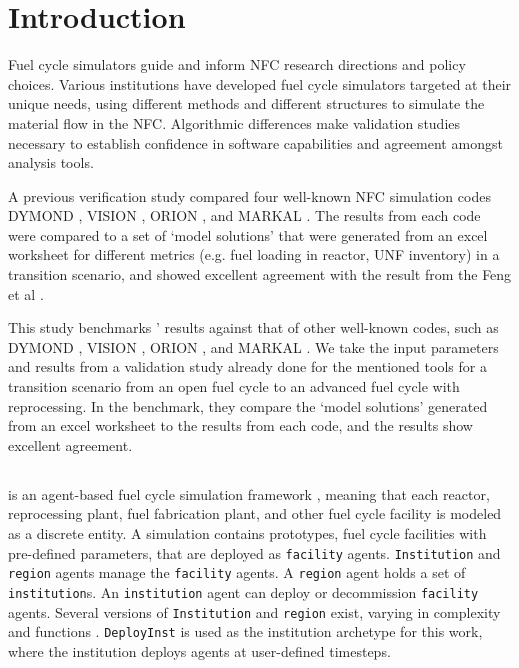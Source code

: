 
\section{Introduction}
Fuel cycle simulators guide and inform \gls{NFC} research directions and policy choices.
Various institutions have developed fuel cycle simulators targeted at their unique needs,
using different methods and different structures
to simulate the material flow in the \gls{NFC}.
Algorithmic differences make
validation studies necessary to establish
confidence in software capabilities and
agreement amongst analysis tools.

A previous verification study \cite{feng_standardized_2016} compared
four well-known \gls{NFC} simulation codes
DYMOND \cite{yacout_modeling_2005},
VISION \cite{jacobson_verifiable_2010},
ORION \cite{gregg_analysis_2012}, and
MARKAL \cite{shay_epa_2006}. The results from each code
were compared to a set of `model solutions' that were generated
from an excel worksheet for different metrics (e.g. fuel loading in reactor,
\gls{UNF} inventory) in a transition scenario, and showed excellent agreement
with the result from the Feng et al \cite{feng_standardized_2016}.


This study benchmarks \Cyclus' results
against that of other well-known codes, such as
DYMOND \cite{yacout_modeling_2005},
VISION \cite{jacobson_verifiable_2010},
ORION \cite{gregg_analysis_2012}, and
MARKAL \cite{shay_epa_2006}. We take the input
parameters and results from a validation study
\cite{feng_standardized_2016} already done for the
mentioned tools for a transition scenario from an
open fuel cycle to an advanced fuel cycle with
reprocessing. In the benchmark, they compare the `model solutions'
generated from an excel worksheet
to the results from each code, and the results show
excellent agreement.


\subsection{\Cyclus}

\Cyclus is an agent-based fuel cycle simulation framework 
\cite{huff_fundamental_2016}, meaning 
that each reactor, reprocessing plant, fuel fabrication plant, and other fuel cycle
facility is modeled as a discrete entity.
A \Cyclus simulation contains prototypes, fuel cycle facilities with
pre-defined parameters, that are deployed as \texttt{facility} agents.
\texttt{Institution} and \texttt{region} agents manage the \texttt{facility} agents.
A \texttt{region} agent holds a set of \texttt{institution}s.
An \texttt{institution} agent can deploy or decommission \texttt{facility} agents.
Several versions of \texttt{Institution}
and \texttt{region} exist, varying in complexity and functions \cite{huff_extensions_2014}.
 \texttt{DeployInst} is used as the institution archetype for this work, where the institution
deploys agents at user-defined timesteps.

